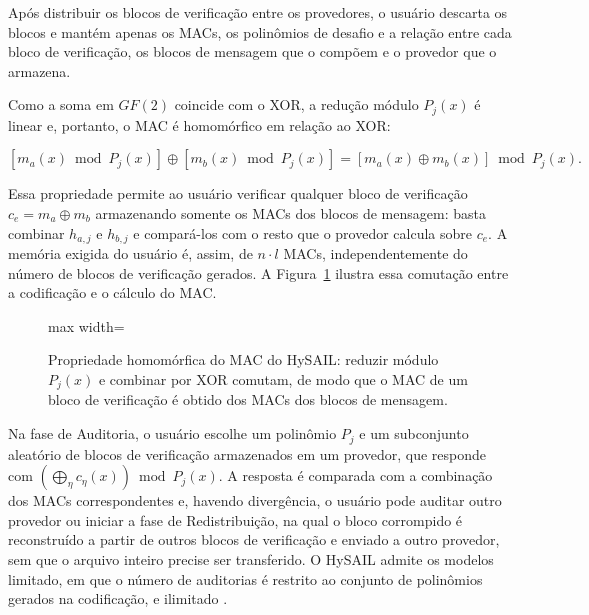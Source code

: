 Após distribuir os blocos de verificação entre os provedores, o usuário descarta os blocos e mantém apenas os \acrshort{MAC}s, os polinômios de desafio e a relação entre cada bloco de verificação, os blocos de mensagem que o compõem e o provedor que o armazena.

Como a soma em $GF(2)$ coincide com o XOR, a redução módulo $P_j(x)$ é linear e, portanto, o \acrshort{MAC} é homomórfico em relação ao XOR:

\begin{equation}
	\left[m_a(x) \bmod P_j(x)\right] \oplus \left[m_b(x) \bmod P_j(x)\right] = \left[m_a(x) \oplus m_b(x)\right] \bmod P_j(x).
	\label{eq:hysail_homomorfismo}
\end{equation}

Essa propriedade permite ao usuário verificar qualquer bloco de verificação $c_e = m_a \oplus m_b$ armazenando somente os \acrshort{MAC}s dos blocos de mensagem: basta combinar $h_{a,j}$ e $h_{b,j}$ e compará-los com o resto que o provedor calcula sobre $c_e$. A memória exigida do usuário é, assim, de $n \cdot l$ \acrshort{MAC}s, independentemente do número de blocos de verificação gerados. A Figura~\ref{fig:mac_homomorfico} ilustra essa comutação entre a codificação e o cálculo do \acrshort{MAC}.

\begin{figure}[htbp]
	\centering
	\begin{adjustbox}{max width=\textwidth}
		
	\end{adjustbox}
	\caption{Propriedade homomórfica do \acrshort{MAC} do HySAIL: reduzir módulo $P_j(x)$ e combinar por XOR comutam, de modo que o \acrshort{MAC} de um bloco de verificação é obtido dos \acrshort{MAC}s dos blocos de mensagem.}
	\label{fig:mac_homomorfico}
\end{figure}

Na fase de Auditoria, o usuário escolhe um polinômio $P_j$ e um subconjunto aleatório de blocos de verificação armazenados em um provedor, que responde com $\left(\bigoplus_\eta c_\eta(x)\right) \bmod P_j(x)$. A resposta é comparada com a combinação dos \acrshort{MAC}s correspondentes e, havendo divergência, o usuário pode auditar outro provedor ou iniciar a fase de Redistribuição, na qual o bloco corrompido é reconstruído a partir de outros blocos de verificação e enviado a outro provedor, sem que o arquivo inteiro precise ser transferido. O HySAIL admite os modelos limitado, em que o número de auditorias é restrito ao conjunto de polinômios gerados na codificação, e ilimitado \cite{amaral2019hysail}.


